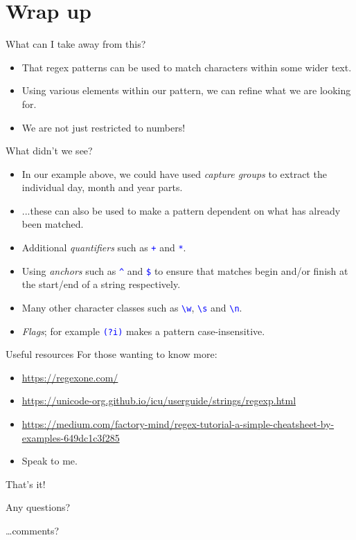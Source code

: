 \documentclass[
	usenames,
	dvipsnames,
	handout
] {beamer}
\newcommand{\reWord}{\textbackslash{}w}
\newcommand{\reSpace}{\textbackslash{}s}
\newcommand{\reNewLine}{\textbackslash{}n}
\newcommand{\rePattern}[1]{{\Large\texttt{\textcolor{blue}{#1}}}}
\begin{document}
\section{Wrap up}
\begin{frame}{What can I take away from this?}
	\begin{itemize}[label=\textbullet]
		\item That regex patterns can be used to match characters within some wider text.
			\pause
		\item Using various elements within our pattern, we can refine what we are looking for.
			\pause
		\item We are not just restricted to numbers!
	\end{itemize}
\end{frame}

\begin{frame}{What didn't we see?}
	\begin{itemize}[label=\textbullet]
		\item In our example above, we could have used \emph{capture groups} to extract the individual day, month and year parts.
			\pause
		\item ...these can also be used to make a pattern dependent on what has already been matched.
			\pause
		\item Additional \emph{quantifiers} such as \rePattern{+} and \rePattern{*}.
			\pause
		\item Using \emph{anchors} such as \rePattern{\^{}} and \rePattern{\$} to ensure that matches begin and/or finish at the start/end of a string respectively.
			\pause
		\item Many other character classes such as \rePattern{\reWord}, \rePattern{\reSpace} and \rePattern{\reNewLine}.
			\pause
		\item \emph{Flags}; for example \rePattern{(?i)} makes a pattern case-insensitive.
	\end{itemize}
\end{frame}

\begin{frame}{Useful resources}
	For those wanting to know more: \\
		\pause
	\medskip

	\begin{itemize}[label=\textbullet]
		\item \url{https://regexone.com/}
			\pause
		\item \url{https://unicode-org.github.io/icu/userguide/strings/regexp.html}
			\pause
		\item \url{https://medium.com/factory-mind/regex-tutorial-a-simple-cheatsheet-by-examples-649dc1c3f285}
			\pause
		\item Speak to me.
	\end{itemize}
\end{frame}

\begin{frame}{That's it!}
	\Huge
	\bfseries
	\begin{center}	
		Any questions?
		
		\ldots comments?
	\end{center}
\end{frame}
			
\end{document}
